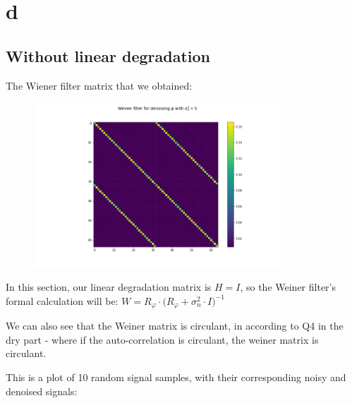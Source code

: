 \documentclass[a4paper]{article}
\begin{document}
\newpage 

\section*{d}

\subsection*{Without linear degradation}

The Wiener filter matrix that we obtained:

\begin{figure}[h]
    \centering
    \includegraphics[width=350,keepaspectratio]{p2q1d_weiner_one.png}
\end{figure}

In this section, our linear degradation matrix is $H=I$, so the Weiner filter's formal calculation will be: $W=R_\varphi \cdot \big( R_\varphi + \sigma_n^2 \cdot I \big) ^ {-1}$

We can also see that the Weiner matrix is circulant, in according to Q4 in the dry part - where if the auto-correlation is circulant, the weiner matrix is circulant.


\newpage 

This is a plot of 10 random signal samples, with their corresponding noisy and denoised signals:
\end{document}
